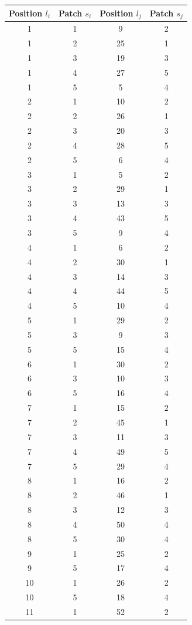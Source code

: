 \documentclass[a4paper, amsfonts, amssymb, amsmath, reprint, showkeys, nofootinbib, twoside]{revtex4-1}
\begin{document}
\begin{longtable}[h!]{ cccc }
	\hline
	Position $l_i$ & Patch $s_i$ & Position $l_j$ & Patch $s_j$ \\
	\hline
	1 & 1 & 9 & 2 \\
	1 & 2 & 25 & 1 \\
	1 & 3 & 19 & 3 \\
	1 & 4 & 27 & 5 \\
	1 & 5 & 5 & 4 \\
	2 & 1 & 10 & 2 \\
	2 & 2 & 26 & 1 \\
	2 & 3 & 20 & 3 \\
	2 & 4 & 28 & 5 \\
	2 & 5 & 6 & 4 \\
	3 & 1 & 5 & 2 \\
	3 & 2 & 29 & 1 \\
	3 & 3 & 13 & 3 \\
	3 & 4 & 43 & 5 \\
	3 & 5 & 9 & 4 \\
	4 & 1 & 6 & 2 \\
	4 & 2 & 30 & 1 \\
	4 & 3 & 14 & 3 \\
	4 & 4 & 44 & 5 \\
	4 & 5 & 10 & 4 \\
	5 & 1 & 29 & 2 \\
	5 & 3 & 9 & 3 \\
	5 & 5 & 15 & 4 \\
	6 & 1 & 30 & 2 \\
	6 & 3 & 10 & 3 \\
	6 & 5 & 16 & 4 \\
	7 & 1 & 15 & 2 \\
	7 & 2 & 45 & 1 \\
	7 & 3 & 11 & 3 \\
	7 & 4 & 49 & 5 \\
	7 & 5 & 29 & 4 \\
	8 & 1 & 16 & 2 \\
	8 & 2 & 46 & 1 \\
	8 & 3 & 12 & 3 \\
	8 & 4 & 50 & 4 \\
	8 & 5 & 30 & 4 \\
	9 & 1 & 25 & 2 \\
	9 & 5 & 17 & 4 \\
	10 & 1 & 26 & 2 \\
	10 & 5 & 18 & 4 \\
	11 & 1 & 52 & 2 \\

\end{longtable}
\end{document}
